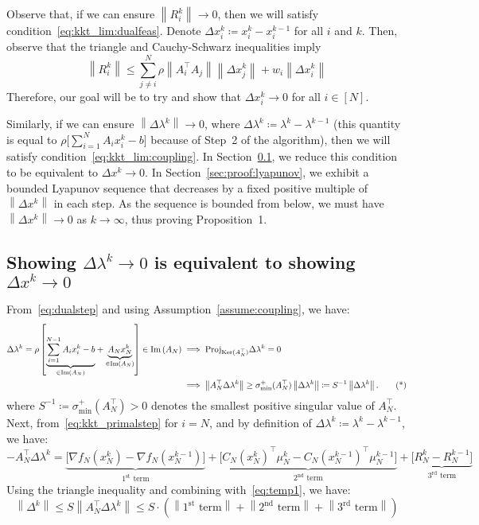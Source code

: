 \documentclass[11pt]{article}
\newcommand{\Image}[1]{\mathop{\text{Im}}\left(#1\right)}
\newcommand{\norm}[1]{\left\lVert #1 \right\rVert}
\begin{document}
Observe that, if we can ensure $\norm{R_i^k} \to 0$, then we will satisfy condition~\eqref{eq:kkt_lim:dualfeas}.
Denote $\Delta x_i^k \coloneqq x_i^k - x_i^{k - 1}$ for all $i$ and $k$. Then, observe that the triangle and Cauchy-Schwarz inequalities imply 
\begin{equation*}
\norm{R_i^k} \leq  \sum_{j \neq i}^N \rho \norm{A_i^\top A_j} \norm{\Delta x_j^k} + w_i\norm{\Delta x_i^k}
\end{equation*}
Therefore, our goal will be to try and show that $\Delta x_i^k \to 0$ for all $i \in [N]$.

Similarly, if we can ensure $\norm{\Delta \lambda^k} \to 0$, where $\Delta \lambda^k \coloneqq \lambda^k - \lambda^{k-1}$ (this quantity is equal to $\rho \big[\sum_{i = 1}^N A_i x_i^k - b\big]$ because of Step~2 of the algorithm), then we will satisfy condition~\eqref{eq:kkt_lim:coupling}.
In Section~\ref{sec:proof:lambda_to_x}, we reduce this condition to be equivalent to $\Delta x^k \to 0$.
In Section~\ref{sec:proof:lyapunov}, we exhibit a bounded Lyapunov sequence that decreases by a fixed positive multiple of $\norm{\Delta x^k}$ in each step.
As the sequence is bounded from below, we must have $\norm{\Delta x^k} \to 0$ as $k \to \infty$, thus proving Proposition~1.

\subsection{Showing $\Delta \lambda^k \to 0$ is equivalent to showing $\Delta x^k \to 0$}\label{sec:proof:lambda_to_x}
From~\eqref{eq:dualstep} and using Assumption~\ref{assume:coupling}, we have:
\begin{align}
\Delta \lambda^k = \rho\left[\underset{\in \Image{A_N}}{\underbrace{\sum_{i = 1}^{N-1} A_ix_i^k - b}} + \underset{\in \Image{A_N}}{\underbrace{A_N x_N^k}}\right] \in \Image{A_N}
&\implies \text{Proj}_{\text{Ker}(A_N^\top)} \Delta \lambda^k = 0 \notag \\
&\implies \norm{A_N^\top \Delta \lambda^k} \geq \sigma^{+}_{\text{min}}(A_N^\top) \norm{\Delta \lambda^k} \coloneqq S^{-1} \norm{\Delta \lambda^k}. \tag{*} \label{eq:temp1}
\end{align}
where $S^{-1} \coloneqq \sigma^{+}_{\text{min}}(A_N^\top) > 0$ denotes the smallest positive singular value of $A_N^\top$.
Next, from~\eqref{eq:kkt_primalstep} for $i = N$, and by definition of $\Delta \lambda^k \coloneqq \lambda^k - \lambda^{k-1}$, we have:
\begin{equation*}
-A_N^\top \Delta \lambda^k =
\underset{1^\text{st} \text{ term}}{\underbrace{\big[\nabla f_N(x_N^k) - \nabla f_N(x_N^{k-1})\big]}}
+ \underset{2^\text{nd} \text{ term}}{\underbrace{\big[C_N(x_N^k)^\top \mu_N^k - C_N(x_N^{k-1})^\top \mu_N^{k-1}\big]}}
+ \underset{3^\text{rd} \text{ term}}{\underbrace{\big[R_N^k - R_N^{k-1}\big]}}
\end{equation*}
Using the triangle inequality and combining with~\eqref{eq:temp1}, we have:
\begin{equation*}
\norm{\Delta^k} \leq S\norm{A_N^\top \Delta \lambda^k} \leq S\cdot\left(\norm{1^\text{st} \text{ term}} + \norm{2^\text{nd} \text{ term}} + \norm{3^\text{rd} \text{ term}}\right)
\end{equation*}
\end{document}
